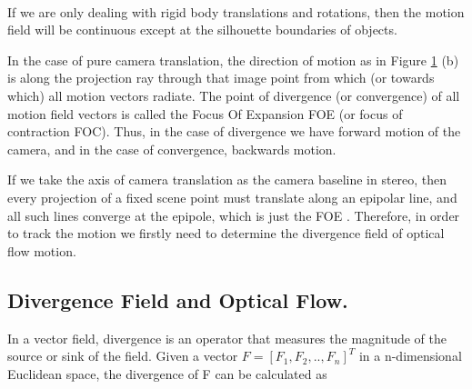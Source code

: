 \begin{figure}[h]
\begin{dBox}
\centering
  \mbox{
   }
   \caption{\label{fig:dynamic12} }   
\end{dBox}   
\end{figure}

If we are only dealing with rigid body translations and rotations, then the motion field will be continuous except at the silhouette boundaries of objects.\bigskip

In the case of pure camera translation, the direction of motion as in Figure \ref{fig:dynamic12} (b) is along the projection ray through that image point from which (or towards which) all motion vectors radiate. The point of divergence (or convergence) of all motion field vectors is called the Focus Of Expansion FOE (or focus of contraction FOC). Thus, in the case of divergence we have forward motion of the camera, and in the case of convergence, backwards motion.\bigskip

If we take the axis of camera translation as the camera baseline in stereo, then every projection of a fixed scene point must translate along an epipolar line, and all such lines converge at the epipole, which is just the FOE \cite{dynamic1}.  Therefore, in order to track the motion we firstly need to determine the divergence field of optical flow motion.\bigskip


\subsection{Divergence Field and Optical Flow.}
In a vector field, divergence is an operator that measures the magnitude of the source or sink of the field. Given a vector $F=[F_1,F_2,..,F_n]^T$ in a n-dimensional Euclidean space, the divergence of F can be calculated as \bigskip

